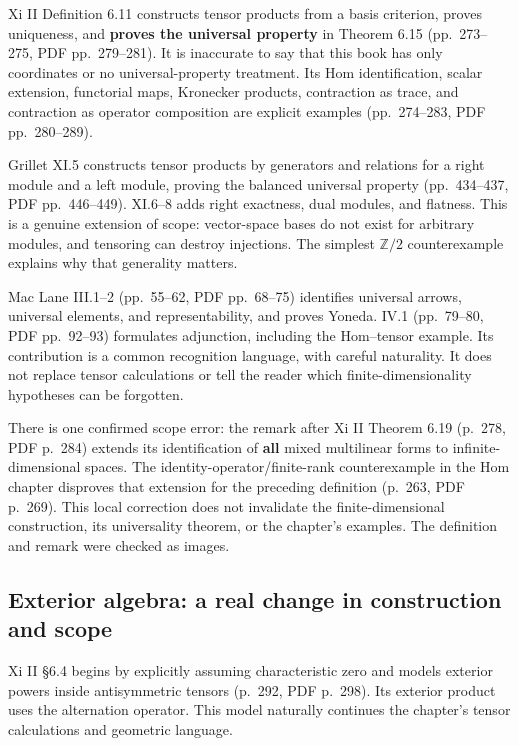 \documentclass[
  11pt,
]{article}
\begin{document}
Xi II Definition 6.11 constructs tensor products from a basis criterion,
proves uniqueness, and \textbf{proves the universal property} in Theorem
6.15 (pp.~273--275, PDF pp.~279--281). It is inaccurate to say that this
book has only coordinates or no universal-property treatment. Its Hom
identification, scalar extension, functorial maps, Kronecker products,
contraction as trace, and contraction as operator composition are
explicit examples (pp.~274--283, PDF pp.~280--289).

Grillet XI.5 constructs tensor products by generators and relations for
a right module and a left module, proving the balanced universal
property (pp.~434--437, PDF pp.~446--449). XI.6--8 adds right exactness,
dual modules, and flatness. This is a genuine extension of scope:
vector-space bases do not exist for arbitrary modules, and tensoring can
destroy injections. The simplest \(\mathbb Z/2\) counterexample explains
why that generality matters.

Mac Lane III.1--2 (pp.~55--62, PDF pp.~68--75) identifies universal
arrows, universal elements, and representability, and proves Yoneda.
IV.1 (pp.~79--80, PDF pp.~92--93) formulates adjunction, including the
Hom--tensor example. Its contribution is a common recognition language,
with careful naturality. It does not replace tensor calculations or tell
the reader which finite-dimensionality hypotheses can be forgotten.

There is one confirmed scope error: the remark after Xi II Theorem 6.19
(p.~278, PDF p.~284) extends its identification of \textbf{all} mixed
multilinear forms to infinite-dimensional spaces. The
identity-operator/finite-rank counterexample in the Hom chapter
disproves that extension for the preceding definition (p.~263, PDF
p.~269). This local correction does not invalidate the
finite-dimensional construction, its universality theorem, or the
chapter's examples. The definition and remark were checked as images.

\subsection{Exterior algebra: a real change in construction and
scope}\label{exterior-algebra-a-real-change-in-construction-and-scope}

Xi II §6.4 begins by explicitly assuming characteristic zero and models
exterior powers inside antisymmetric tensors (p.~292, PDF p.~298). Its
exterior product uses the alternation operator. This model naturally
continues the chapter's tensor calculations and geometric language.
\end{document}
